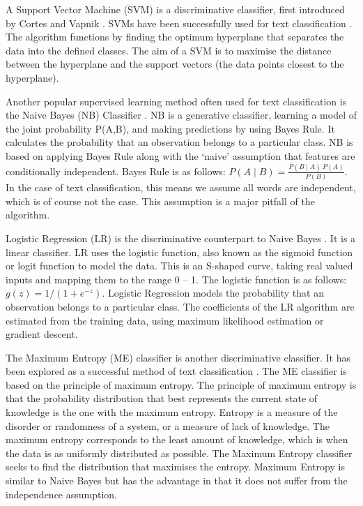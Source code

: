 A Support Vector Machine (SVM) is a discriminative classifier, first introduced by Cortes and Vapnik \cite{Vapnik1995,Vapnik21995}. SVMs have been successfully used for text classification \cite{Joachims1998, tong2001support}. The algorithm functions by finding the optimum hyperplane that separates the data into the defined classes. The aim of a SVM is to maximise the distance between the hyperplane and the support vectors (the data points closest to the hyperplane). 

Another popular supervised learning method often used for text classification is the Naive Bayes (NB) Classifier  \cite{NaiveBayes1998}. NB is a generative classifier, learning a model of the joint probability P(A,B), and making predictions by using Bayes Rule. It calculates the probability that an observation belongs to a particular class. NB is based on applying Bayes Rule along with the ‘naive’ assumption that features are conditionally independent. Bayes Rule is as follows:  \(P(A\mid B)=\frac{P(B\mid A)\:P(A)}{P(B)}\). In the case of text classification, this means we assume all words are independent, which is of course not the case. This assumption is a major pitfall of the algorithm. 

Logistic Regression (LR) is the discriminative counterpart to Naive Bayes \cite{ng2002discriminative}. It is a linear classifier. LR uses the logistic function, also known as the sigmoid function or logit function to model the data. This is an S-shaped curve, taking real valued inputs and mapping them to the range 0 – 1. The logistic function is as follows: \(g(z)=1/(1+e^{-z})\). Logistic Regression models the probability that an observation belongs to a particular class. The coefficients of the LR algorithm are estimated from the training data, using maximum likelihood estimation or gradient descent.

The Maximum Entropy (ME) classifier is another discriminative classifier. It has been explored as a successful method of text classification \cite{MaxEnt1999}. The ME classifier is based on the principle of maximum entropy. The principle of maximum entropy is that the probability distribution that best represents the current state of knowledge is the one with the maximum entropy. Entropy is a measure of the disorder or randomness of a system, or a measure of lack of knowledge. The maximum entropy corresponds to the least amount of knowledge, which is when the data is as uniformly distributed as possible. The Maximum Entropy classifier seeks to find the distribution that maximises the entropy. Maximum Entropy is similar to Naive Bayes but has the advantage in that it does not suffer from the independence assumption.

